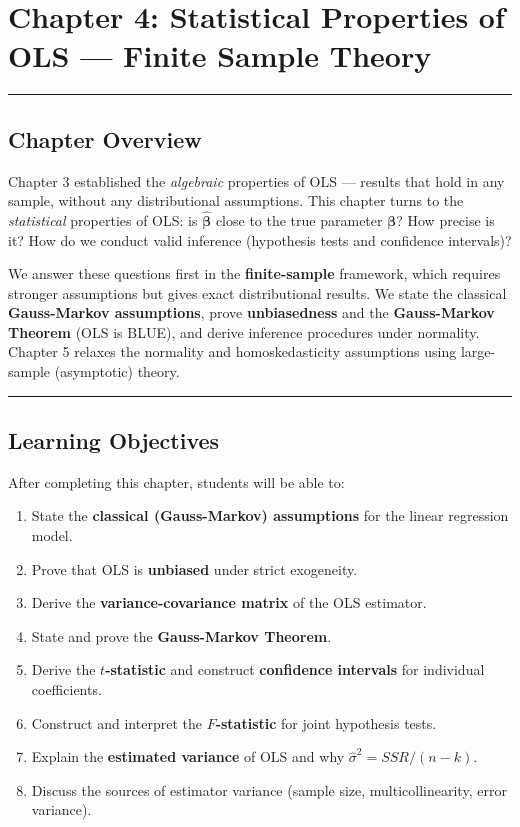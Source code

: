 \chapter{Chapter 4: Statistical Properties of OLS --- Finite Sample Theory}

\medskip\hrule\medskip

\section{Chapter Overview}

Chapter 3 established the \textit{algebraic} properties of OLS --- results that hold in any sample, without any distributional assumptions. This chapter turns to the \textit{statistical} properties of OLS: is $\hat{\boldsymbol{\beta}}$ close to the true parameter $\boldsymbol{\beta}$? How precise is it? How do we conduct valid inference (hypothesis tests and confidence intervals)?

We answer these questions first in the \textbf{finite-sample} framework, which requires stronger assumptions but gives exact distributional results. We state the classical \textbf{Gauss-Markov assumptions}, prove \textbf{unbiasedness} and the \textbf{Gauss-Markov Theorem} (OLS is BLUE), and derive inference procedures under normality. Chapter 5 relaxes the normality and homoskedasticity assumptions using large-sample (asymptotic) theory.

\medskip\hrule\medskip

\section{Learning Objectives}

After completing this chapter, students will be able to:

\begin{enumerate}
\item State the \textbf{classical (Gauss-Markov) assumptions} for the linear regression model.
\item Prove that OLS is \textbf{unbiased} under strict exogeneity.
\item Derive the \textbf{variance-covariance matrix} of the OLS estimator.
\item State and prove the \textbf{Gauss-Markov Theorem}.
\item Derive the \textbf{$t$-statistic} and construct \textbf{confidence intervals} for individual coefficients.
\item Construct and interpret the \textbf{$F$-statistic} for joint hypothesis tests.
\item Explain the \textbf{estimated variance} of OLS and why $\hat{\sigma}^2 = SSR/(n-k)$.
\item Discuss the sources of estimator variance (sample size, multicollinearity, error variance).
\end{enumerate}

